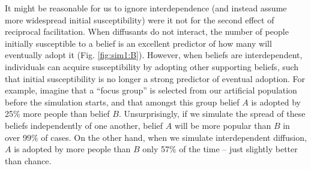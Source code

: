 \documentclass[9pt,twocolumn,twoside,lineno]{pnas-new}
\begin{document}
It might be reasonable for us to ignore interdependence (and instead assume more widespread initial susceptibility) were it not for the second effect of reciprocal facilitation. When diffusants do not interact, the number of people initially susceptible to a belief is an excellent predictor of how many will eventually adopt it (Fig. \ref{fig:sim1:B}). However, when beliefs are interdependent, individuals can acquire susceptibility by adopting other supporting beliefs, such that initial susceptibility is no longer a strong predictor of eventual adoption. For example, imagine that a “focus group” is selected from our artificial population before the simulation starts, and that amongst this group belief $A$ is adopted by 25\% more people than belief $B$. Unsurprisingly, if we simulate the spread of these beliefs independently of one another, belief $A$ will be more popular than $B$ in over 99\% of cases. On the other hand, when we simulate interdependent diffusion, $A$ is adopted by more people than $B$ only 57\% of the time – just slightly better than chance.
\end{document}
